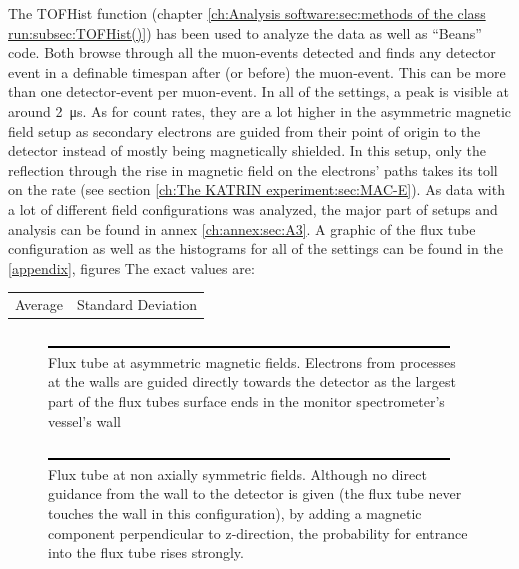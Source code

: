  	
  The TOFHist function (chapter \ref{ch:Analysis software:sec:methods of the class run:subsec:TOFHist()}) has been used to analyze the data as well as ``Beans'' code.
  Both browse through all the muon-events detected and finds any detector event in a definable timespan after (or before) the muon-event. This can be more than one detector-event per muon-event. In all of the settings, a peak is visible at around \SI{2}{\micro\second}. As for count rates, they are a lot higher in the asymmetric magnetic field setup as secondary electrons are guided from their point of origin to the detector instead of mostly being magnetically shielded. In this setup, only the reflection through the rise in magnetic field on the electrons' paths takes its toll on the rate (see section \ref{ch:The KATRIN experiment:sec:MAC-E}).
  As data with a lot of different field configurations was analyzed, the major part of setups and analysis can be found in annex \ref{ch:annex:sec:A3}.
  A graphic of the flux tube configuration as well as the histograms for all of the settings can be found in the \ref{appendix}, figures 
  The exact values are:
  \begin{table}
  	\begin{tabularx}{0.8\textwidth}{>{\centering}X>{\centering\arraybackslash}X}
  		Average & Standard Deviation\\
  	\end{tabularx}
  \end{table}

  
  
  \begin{figure}
	\includegraphics{graphics/dummy.eps}
	\caption[Asymmetric magnetic field flux tube]{Flux tube at asymmetric magnetic fields. Electrons from processes at the walls are guided directly towards the detector as the largest part of the flux tubes surface ends in the monitor spectrometer's vessel's wall}
  	\label{fig:monSpec:asymmetric magnetic field}
  \end{figure}

    \begin{figure}
	
	\includegraphics{graphics/dummy.eps}
  	\caption[Non-axially symmetric magnetic flux tube]{Flux tube at non axially symmetric fields. Although no direct guidance from the wall to the detector is given (the flux tube never touches the wall in this configuration), by adding a magnetic component perpendicular to z-direction, the probability for entrance into the flux tube rises strongly.}
  	\label{fig:monSpec:non axially symmetric magnetic field}
  \end{figure}
  
